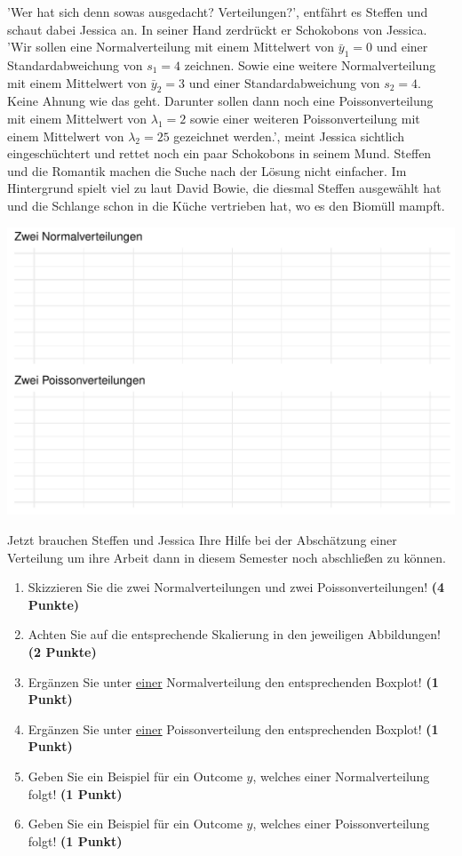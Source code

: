 \documentclass[a4paper, 9pt]{scrartcl}\usepackage[]{graphicx}\usepackage[]{xcolor}
\makeatletter
\def\maxwidth{ %
  \ifdim\Gin@nat@width>\linewidth
    \linewidth
  \else
    \Gin@nat@width
  \fi
}
\makeatother
\begin{document}
'Wer hat sich denn sowas ausgedacht? Verteilungen?', entfährt es Steffen und schaut dabei Jessica an. In seiner Hand zerdrückt er Schokobons von Jessica. 'Wir sollen eine Normalverteilung mit einem Mittelwert von $\bar{y}_1 = 0$ und einer Standardabweichung von $s_1 = 4$ zeichnen. Sowie eine weitere Normalverteilung mit einem Mittelwert von $\bar{y}_2 = 3$ und einer Standardabweichung von $s_2 = 4$. Keine Ahnung wie das geht. Darunter sollen dann noch eine Poissonverteilung mit einem Mittelwert von $\lambda_1 = 2$ sowie einer weiteren Poissonverteilung mit einem Mittelwert von $\lambda_2 = 25$ gezeichnet werden.', meint Jessica sichtlich eingeschüchtert und rettet noch ein paar Schokobons in seinem Mund. Steffen und die Romantik machen die Suche nach der Lösung nicht einfacher. Im Hintergrund spielt viel zu laut David Bowie, die diesmal Steffen ausgewählt hat und die Schlange schon in die Küche vertrieben hat, wo es den Biomüll mampft.\\




{\centering \includegraphics[width=\maxwidth]{img/histogram-01-1} 

}




Jetzt brauchen Steffen und Jessica Ihre Hilfe bei der Abschätzung einer Verteilung um ihre Arbeit dann in diesem Semester noch abschließen zu können.


\begin{enumerate}
\item Skizzieren Sie die zwei Normalverteilungen und zwei Poissonverteilungen! \textbf{(4 Punkte)}
\item Achten Sie auf die entsprechende Skalierung in den jeweiligen Abbildungen! \textbf{(2 Punkte)}
\item Ergänzen Sie unter \underline{einer} Normalverteilung den entsprechenden Boxplot! \textbf{(1 Punkt)}
\item Ergänzen Sie unter \underline{einer} Poissonverteilung den entsprechenden Boxplot! \textbf{(1 Punkt)}
\item Geben Sie ein Beispiel für ein Outcome $y$, welches einer Normalverteilung folgt! \textbf{(1 Punkt)}
\item Geben Sie ein Beispiel für ein Outcome $y$, welches einer Poissonverteilung folgt! \textbf{(1 Punkt)}
\end{enumerate} 
\clearpage
\end{document}
